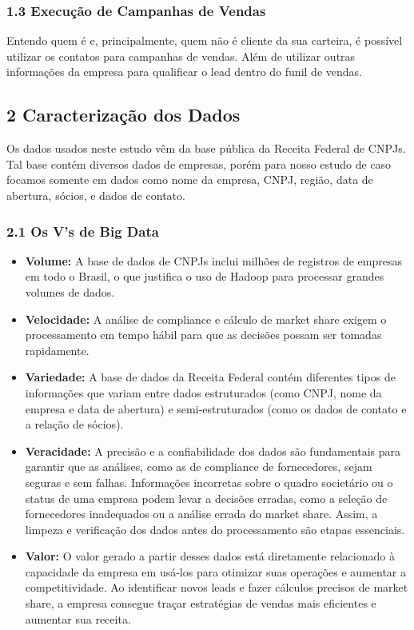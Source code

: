 \subsubsection*{1.3 Execução de Campanhas de Vendas}
Entendo quem é e, principalmente, quem não é cliente da sua carteira, é possível utilizar os contatos para campanhas de vendas. Além de utilizar outras informações da empresa para qualificar o lead dentro do funil de vendas.

\subsection*{\textbf{2 Caracterização dos Dados}}
Os dados usados neste estudo vêm da base pública da Receita Federal de CNPJs. Tal base contém diversos dados de empresas, porém para nosso estudo de caso focamos somente em dados como nome da empresa, CNPJ, região, data de abertura, sócios, e dados de contato.


\subsubsection*{2.1 Os V's de Big Data}

\begin{itemize}
    \item \textbf{Volume:} A base de dados de CNPJs inclui milhões de registros de empresas em todo o Brasil, o que justifica o uso de Hadoop para processar grandes volumes de dados.
    \item \textbf{Velocidade:} A análise de compliance e cálculo de market share exigem o processamento em tempo hábil para que as decisões possam ser tomadas rapidamente.
    \item \textbf{Variedade:} A base de dados da Receita Federal contém diferentes tipos de informações que variam entre dados estruturados (como CNPJ, nome da empresa e data de abertura) e semi-estruturados (como os dados de contato e a relação de sócios). 
    \item \textbf{Veracidade:} A precisão e a confiabilidade dos dados são fundamentais para garantir que as análises, como as de compliance de fornecedores, sejam seguras e sem falhas. Informações incorretas sobre o quadro societário ou o status de uma empresa podem levar a decisões erradas, como a seleção de fornecedores inadequados ou a análise errada do market share. Assim, a limpeza e verificação dos dados antes do processamento são etapas essenciais.
    \item \textbf{Valor:} O valor gerado a partir desses dados está diretamente relacionado à capacidade da empresa em usá-los para otimizar suas operações e aumentar a competitividade. Ao identificar novos leads e fazer cálculos precisos de market share, a empresa consegue traçar estratégias de vendas mais eficientes e aumentar sua receita.
\end{itemize}

